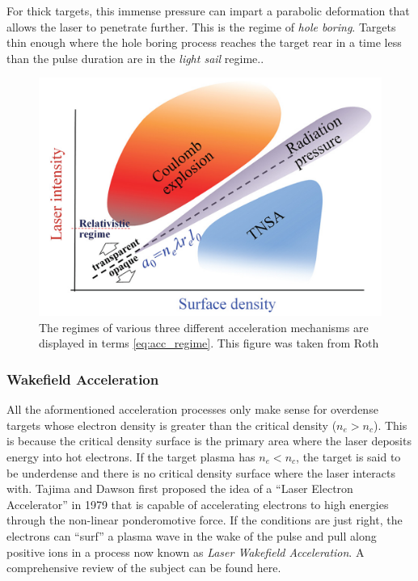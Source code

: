 For thick targets, this immense pressure can impart a parabolic deformation that allows the laser to penetrate further. This is the regime of \emph{hole boring}. Targets thin enough where the hole boring process reaches the target rear in a time less than the pulse duration are in the \emph{light sail} regime.\cite{Macchi_2013_RevModPhys}. 

\begin{figure}
	\centering 
	\includegraphics[width=0.75\linewidth]{planning/images/acceleration_regimes.PNG}
	\caption{The regimes of various three different acceleration mechanisms are displayed in terms \cref{eq:acc_regime}. This figure was taken from Roth\cite{Lezhnin_2015_PoP}}
	\label{fig:regimes}
\end{figure}

\subsubsection{Wakefield Acceleration}
All the aformentioned acceleration processes only make sense for overdense targets whose electron density is greater than the critical density ($n_e > n_c$). This is because the critical density surface is the primary area where the laser deposits energy into hot electrons. If the target plasma has $n_e < n_c$, the target is said to be underdense and there is no critical density surface where the laser interacts with. Tajima and Dawson\cite{Tajima_1979_PRL} first proposed the idea of a ``Laser Electron Accelerator'' in 1979 that is capable of accelerating electrons to high energies through the non-linear ponderomotive force. If the conditions are just right, the electrons can ``surf'' a plasma wave in the wake of the pulse and pull along positive ions in a process now known as \emph{Laser Wakefield Acceleration}. A comprehensive review of the subject can be found here\cite{Esarey_2009_LPA}.

